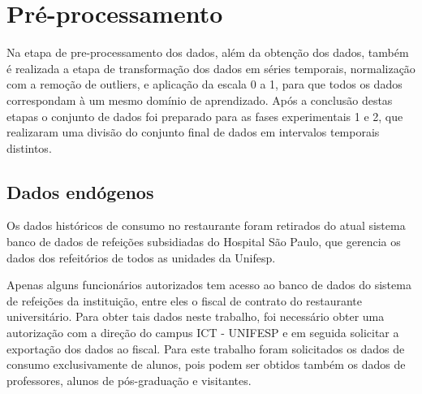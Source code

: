 \documentclass[	12pt, Times, openright, twoside, a4paper, english, brazil]{abntex2}
\begin{document}
	\section{Pré-processamento}
	    Na etapa de pre-processamento dos dados, além da obtenção dos dados, também é realizada a etapa de transformação dos dados em séries temporais, normalização com a remoção de outliers, e aplicação da escala 0 a 1, para que todos os dados correspondam à um mesmo domínio de aprendizado.
	    Após a conclusão destas etapas o conjunto de dados foi preparado para as fases experimentais 1 e 2, que realizaram uma divisão do conjunto final de dados em intervalos temporais distintos.
	    
	    \subsection{Dados endógenos}
        	Os dados históricos de consumo no restaurante foram retirados do atual sistema banco de dados de refeições subsidiadas do Hospital São Paulo, que gerencia os dados dos refeitórios de todos as unidades da Unifesp.
        	
        	Apenas alguns funcionários autorizados tem acesso ao banco de dados do sistema de refeições da instituição, entre eles o fiscal de contrato do restaurante universitário. Para obter tais dados neste trabalho, foi necessário obter uma autorização com a direção do campus ICT - UNIFESP e em seguida solicitar a exportação dos dados ao fiscal. Para este trabalho foram solicitados os dados de consumo exclusivamente de alunos, pois podem ser obtidos também os dados de professores, alunos de pós-graduação e visitantes. 
    
\end{document}
